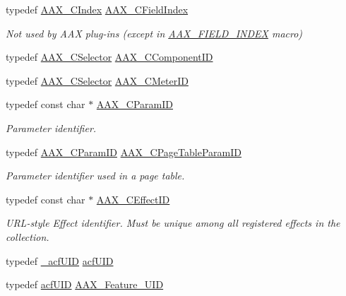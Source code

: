 \begin{DoxyCompactItemize}
typedef \hyperlink{a00149_a24ac375fa55ccadbc3126e6d81146c28}{A\+A\+X\+\_\+\+C\+Index} \hyperlink{a00149_ae807f8986143820cfb5d6da32165c9c7}{A\+A\+X\+\_\+\+C\+Field\+Index}
\begin{DoxyCompactList}\small\item\em Not used by A\+A\+X plug-\/ins (except in \hyperlink{a00149_acf807247ecd6e5899dc9dc31644e9a1d}{A\+A\+X\+\_\+\+F\+I\+E\+L\+D\+\_\+\+I\+N\+D\+E\+X} macro) \end{DoxyCompactList}\item 
typedef \hyperlink{a00149_aeaf9b387f902c50a8360ff423f4a1f23}{A\+A\+X\+\_\+\+C\+Selector} \hyperlink{a00149_a7e697acf597bd7024de6bb13b9845ce7}{A\+A\+X\+\_\+\+C\+Component\+I\+D}
\item 
typedef \hyperlink{a00149_aeaf9b387f902c50a8360ff423f4a1f23}{A\+A\+X\+\_\+\+C\+Selector} \hyperlink{a00149_a6d976263b5f3dd5d01a89d65a3b98ded}{A\+A\+X\+\_\+\+C\+Meter\+I\+D}
\item 
typedef const char $\ast$ \hyperlink{a00149_a1440c756fe5cb158b78193b2fc1780d1}{A\+A\+X\+\_\+\+C\+Param\+I\+D}
\begin{DoxyCompactList}\small\item\em Parameter identifier. \end{DoxyCompactList}\item 
typedef \hyperlink{a00149_a1440c756fe5cb158b78193b2fc1780d1}{A\+A\+X\+\_\+\+C\+Param\+I\+D} \hyperlink{a00149_ab4e01b971dac1b25632fd9f710dd8f77}{A\+A\+X\+\_\+\+C\+Page\+Table\+Param\+I\+D}
\begin{DoxyCompactList}\small\item\em Parameter identifier used in a page table. \end{DoxyCompactList}\item 
typedef const char $\ast$ \hyperlink{a00149_a4b8f04e1a56624da97ace7a28d550dcc}{A\+A\+X\+\_\+\+C\+Effect\+I\+D}
\begin{DoxyCompactList}\small\item\em U\+R\+L-\/style Effect identifier. Must be unique among all registered effects in the collection. \end{DoxyCompactList}\item 
typedef \hyperlink{a00008}{\+\_\+acf\+U\+I\+D} \hyperlink{a00149_a66d978418e20352380f1c775c9180a93}{acf\+U\+I\+D}
\item 
typedef \hyperlink{a00150_ab19414382287ff80930c48a196145214}{acf\+U\+I\+D} \hyperlink{a00149_a53d6cf8a08224b3e813333e411ce798e}{A\+A\+X\+\_\+\+Feature\+\_\+\+U\+I\+D}
\item 

\end{DoxyCompactItemize}
